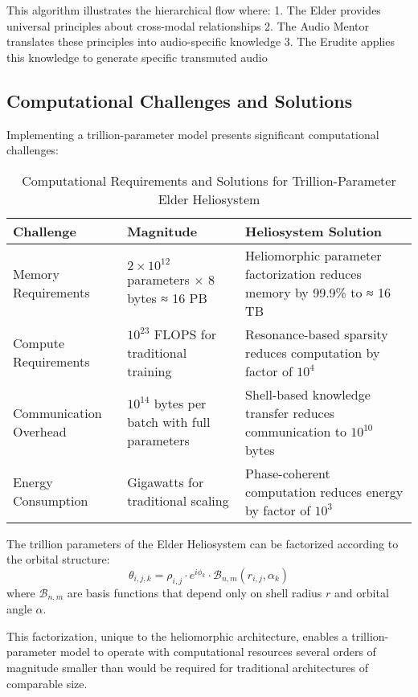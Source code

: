 This algorithm illustrates the hierarchical flow where:
1. The Elder provides universal principles about cross-modal relationships
2. The Audio Mentor translates these principles into audio-specific knowledge
3. The Erudite applies this knowledge to generate specific transmuted audio

\subsection{Computational Challenges and Solutions}

Implementing a trillion-parameter model presents significant computational challenges:

\begin{table}[h]
\centering
\caption{Computational Requirements and Solutions for Trillion-Parameter Elder Heliosystem}
\label{tab:computational_requirements}
\begin{tabular}{|l|p{5cm}|p{5cm}|}
\hline
\textbf{Challenge} & \textbf{Magnitude} & \textbf{Heliosystem Solution} \\
\hline
Memory Requirements & $2 \times 10^{12}$ parameters $\times$ 8 bytes ≈ 16 PB & Heliomorphic parameter factorization reduces memory by 99.9\% to ≈ 16 TB \\
\hline
Compute Requirements & $10^{23}$ FLOPS for traditional training & Resonance-based sparsity reduces computation by factor of $10^4$ \\
\hline
Communication Overhead & $10^{14}$ bytes per batch with full parameters & Shell-based knowledge transfer reduces communication to $10^{10}$ bytes \\
\hline
Energy Consumption & Gigawatts for traditional scaling & Phase-coherent computation reduces energy by factor of $10^3$ \\
\hline
\end{tabular}
\end{table}

\begin{theorem}
The trillion parameters of the Elder Heliosystem can be factorized according to the orbital structure:
\begin{equation}
\theta_{i,j,k} = \rho_{i,j} \cdot e^{i\phi_k} \cdot \mathcal{B}_{n,m}(r_{i,j}, \alpha_k)
\end{equation}
where $\mathcal{B}_{n,m}$ are basis functions that depend only on shell radius $r$ and orbital angle $\alpha$.
\end{theorem}

This factorization, unique to the heliomorphic architecture, enables a trillion-parameter model to operate with computational resources several orders of magnitude smaller than would be required for traditional architectures of comparable size.

